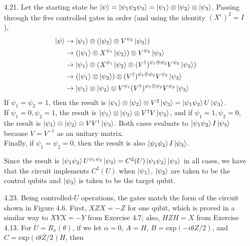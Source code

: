\documentclass[a4paper,12pt]{article}
\begin{document}
\begin{enumerate}
    \item[4.21.] Let the starting state be $\ket{\psi} = \ket{\psi_1 \psi_2 \psi_3} = \ket{\psi_1} \otimes \ket{\psi_2} \otimes \ket{\psi_3}$. Passing through the five controlled gates in order (and using the identity $(X^c)^2 = I$),
        \begin{align*}
            \ket{\psi} &\rightarrow \ket{\psi_1} \otimes (\ket{\psi_2} \otimes V^{\psi_2} \ket{\psi_3}) \\
            &\rightarrow (\ket{\psi_1} \otimes X^{\psi_1} \ket{\psi_2}) \otimes V^{\psi_2} \ket{\psi_3} \\
            &\rightarrow \ket{\psi_1} \otimes (X^{\psi_1} \ket{\psi_2} \otimes (V^\dagger)^{\psi_1 \oplus \psi_2} V^{\psi_2} \ket{\psi_3}) \\
            &\rightarrow (\ket{\psi_1} \otimes \ket{\psi_2}) \otimes (V^\dagger)^{\psi_1 \oplus \psi_2} V^{\psi_2} \ket{\psi_3} \\
            &\rightarrow \ket{\psi_1} \otimes \ket{\psi_2} \otimes V^{\psi_1} (V^\dagger)^{\psi_1 \oplus \psi_2} V^{\psi_2} \ket{\psi_3}
        \end{align*}
        If $\psi_1 = \psi_2 = 1$, then the result is $\ket{\psi_1} \otimes \ket{\psi_2} \otimes V^2 \ket{\psi_3} = \ket{\psi_1 \psi_2} U \ket{\psi_3}$. \\
        If $\psi_1 = 0, \psi_2 = 1$, the result is $\ket{\psi_1} \otimes \ket{\psi_2} \otimes V^\dagger V \ket{\psi_3}$, and if $\psi_1 = 1, \psi_2 = 0$, the result is $\ket{\psi_1} \otimes \ket{\psi_2} \otimes V V^\dagger \ket{\psi_3}$. Both cases evaluate to $\ket{\psi_1 \psi_2} I \ket{\psi_3}$ because $V = V^{-1}$ as an unitary matrix. \\
        Finally, if $\psi_1 = \psi_2 = 0$, then the result is also $\ket{\psi_1 \psi_2} I \ket{\psi_3}$. \par
        Since the result is $\ket{\psi_1 \psi_2} U^{\psi_1 \psi_2} \ket{\psi_3} = C^2(U) \ket{\psi_1 \psi_2} \ket{\psi_3}$ in all cases, we have that the circuit implements $C^2(U)$ when $\ket{\psi_1}$, $\ket{\psi_2}$ are taken to be the control qubits and $\ket{\psi_3}$ is taken to be the target qubit.
    \item[4.23.] Being controlled-$U$ operations, the gates match the form of the circuit shown in Figure 4.6. First, $XZX = -Z$ for one qubit, which is proved in a similar way to $XYX = -Y$ from Exercise 4.7; also, $HZH = X$ from Exercise 4.13. For $U = R_x(\theta)$, if we let $\alpha = 0$, $A = H$, $B = \mbox{exp}(-i \theta Z / 2)$, and $C = \mbox{exp}(i \theta Z / 2) H$, then

\end{enumerate}
\end{document}
